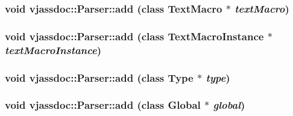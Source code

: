 \hypertarget{classvjassdoc_1_1Parser_6d7f84436463d1caa3f202e88d2b0328}{
\subsubsection{\setlength{\rightskip}{0pt plus 5cm}void vjassdoc::Parser::add (class {\bf TextMacro} $\ast$ {\em textMacro})}}
\label{classvjassdoc_1_1Parser_6d7f84436463d1caa3f202e88d2b0328}


\hypertarget{classvjassdoc_1_1Parser_e78afa8f5282b6bcd9a8de4bbe75fb64}{
\subsubsection{\setlength{\rightskip}{0pt plus 5cm}void vjassdoc::Parser::add (class {\bf TextMacroInstance} $\ast$ {\em textMacroInstance})}}
\label{classvjassdoc_1_1Parser_e78afa8f5282b6bcd9a8de4bbe75fb64}


\hypertarget{classvjassdoc_1_1Parser_2fd653b79c50d22f2c70c5369ee2ced8}{
\subsubsection{\setlength{\rightskip}{0pt plus 5cm}void vjassdoc::Parser::add (class {\bf Type} $\ast$ {\em type})}}
\label{classvjassdoc_1_1Parser_2fd653b79c50d22f2c70c5369ee2ced8}


\hypertarget{classvjassdoc_1_1Parser_bd2d13ef307eadef593f83e8c952067d}{
\subsubsection{\setlength{\rightskip}{0pt plus 5cm}void vjassdoc::Parser::add (class {\bf Global} $\ast$ {\em global})}}
\label{classvjassdoc_1_1Parser_bd2d13ef307eadef593f83e8c952067d}


